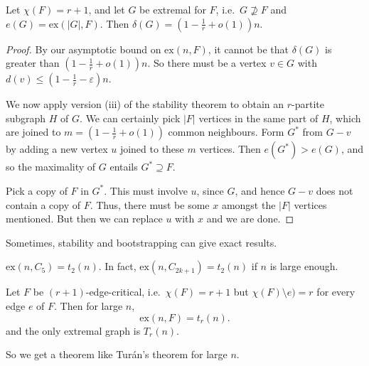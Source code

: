 \documentclass[a4paper]{article}
\renewcommand\ex{\mathrm{ex}}
\begin{document}
\begin{cor}
  Let $\chi(F) = r + 1$, and let $G$ be extremal for $F$, i.e.\ $G \not\supseteq F$ and $e(G) = \ex(|G|, F)$. Then $\delta(G) = \left(1 - \frac{1}{r} + o(1)\right)n$.
\end{cor}

\begin{proof}
  By our asymptotic bound on $\ex(n, F)$, it cannot be that $\delta(G)$ is greater than $\left(1 - \frac{1}{r} + o(1)\right)n$. So there must be a vertex $v \in G$ with $d(v) \leq \left(1 - \frac{1}{r} - \varepsilon\right) n$.

  We now apply version (iii) of the stability theorem to obtain an $r$-partite subgraph $H$ of $G$. We can certainly pick $|F|$ vertices in the same part of $H$, which are joined to $m = \left(1 - \frac{1}{r} + o(1)\right)$ common neighbours. Form $G^*$ from $G - v$ by adding a new vertex $u$ joined to these $m$ vertices. Then $e(G^*) > e(G)$, and so the maximality of $G$ entails $G^* \supseteq F$.

  Pick a copy of $F$ in $G^*$. This must involve $u$, since $G$, and hence $G - v$ does not contain a copy of $F$. Thus, there must be some $x$ amongst the $|F|$ vertices mentioned. But then we can replace $u$ with $x$ and we are done.
\end{proof}

Sometimes, stability and bootstrapping can give exact results.

\begin{eg}
  $\ex(n, C_5) = t_2(n)$. In fact, $\ex(n, C_{2k + 1}) = t_2(n)$ if $n$ is large enough.
\end{eg}

\begin{thm}[Simonovits]
  Let $F$ be $(r + 1)$-edge-critical, i.e.\ $\chi(F) = r + 1$ but $\chi(F) \setminus e) = r$ for every edge $e$ of $F$. Then for large $n$,
  \[
    \ex(n, F) = t_r(n).
  \]
  and the only extremal graph is $T_r(n)$.
\end{thm}
So we get a theorem like Tur\'an's theorem for large $n$.
\end{document}

